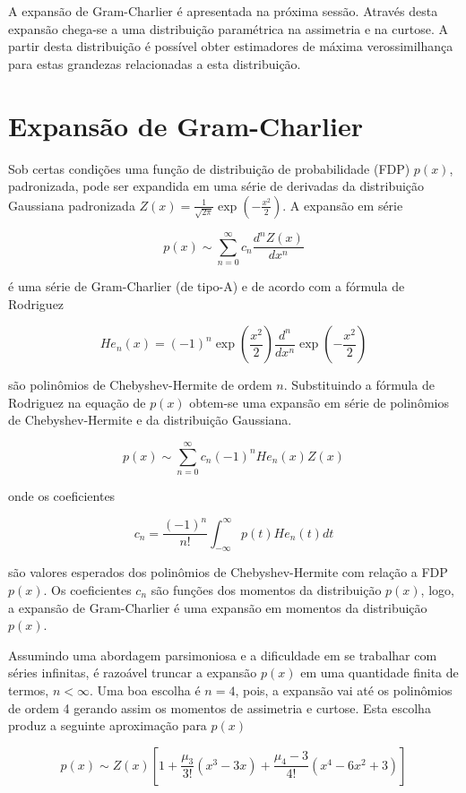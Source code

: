 \documentclass[]{article}
\begin{document}
A expansão de Gram-Charlier é apresentada na próxima sessão. Através
desta expansão chega-se a uma distribuição paramétrica na assimetria e
na curtose. A partir desta distribuição é possível obter estimadores de
máxima verossimilhança para estas grandezas relacionadas a esta
distribuição.

\section{Expansão de Gram-Charlier}\label{expansao-de-gram-charlier}

Sob certas condições uma função de distribuição de probabilidade (FDP)
\(p(x)\), padronizada, pode ser expandida em uma série de derivadas da
distribuição Gaussiana padronizada
\(Z(x) = \frac{1}{\sqrt{2\pi}}\exp\left(-\frac{x^2}{2}\right)\). A
expansão em série

\[
p(x) \sim \sum_{n=0}^\infty c_n \frac{d^n Z(x)}{dx^n}
\]

é uma série de Gram-Charlier (de tipo-A) e de acordo com a fórmula de
Rodriguez

\[
He_n(x) = (-1)^n \exp\left( \frac{x^2}{2} \right) \frac{d^n}{dx^n} \exp\left( -\frac{x^2}{2} \right)
\]

são polinômios de Chebyshev-Hermite de ordem \(n\). Substituindo a
fórmula de Rodriguez na equação de \(p(x)\) obtem-se uma expansão em
série de polinômios de Chebyshev-Hermite e da distribuição Gaussiana.

\[
p(x) \sim \sum_{n=0}^\infty c_n (-1)^n He_n(x) Z(x)
\]

onde os coeficientes

\[
c_n = \frac{(-1)^n}{n!} \int_{-\infty}^{\infty} p(t) He_n(t) dt
\]

são valores esperados dos polinômios de Chebyshev-Hermite com relação a
FDP \(p(x)\). Os coeficientes \(c_n\) são funções dos momentos da
distribuição \(p(x)\), logo, a expansão de Gram-Charlier é uma expansão
em momentos da distribuição \(p(x)\).

Assumindo uma abordagem parsimoniosa e a dificuldade em se trabalhar com
séries infinitas, é razoável truncar a expansão \(p(x)\) em uma
quantidade finita de termos, \(n < \infty\). Uma boa escolha é \(n=4\),
pois, a expansão vai até os polinômios de ordem 4 gerando assim os
momentos de assimetria e curtose. Esta escolha produz a seguinte
aproximação para \(p(x)\)

\[
p(x) \sim Z(x)\left[ 1 + \frac{\mu_3}{3!} (x^3 - 3x) + \frac{\mu_4 - 3}{4!} (x^4 - 6x^2 + 3) \right]
\]
\end{document}
